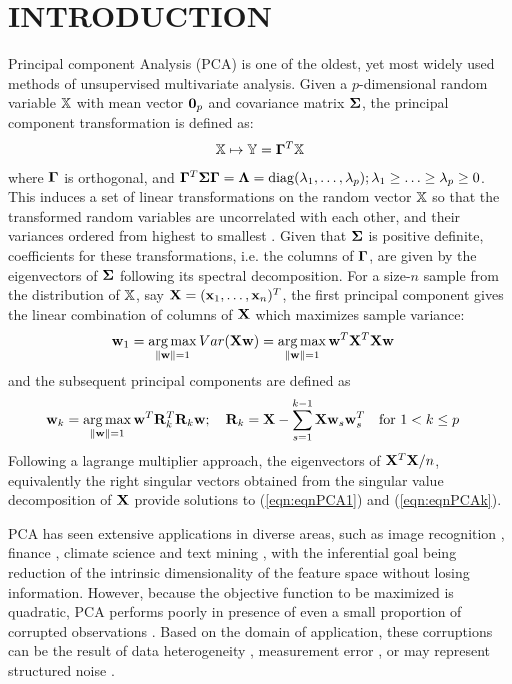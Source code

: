 \section*{\sffamily \Large INTRODUCTION}

Principal component Analysis (PCA) is one of the oldest, yet most widely used methods of unsupervised multivariate analysis. Given a $p$-dimensional random variable ${\mathbb{X}}$ with mean vector ${\bf 0}_p$ and covariance matrix ${\boldsymbol{\Sigma}}$, the principal component transformation is defined as:
%
\begin{align}
{\mathbb{X}} \mapsto {\mathbb{Y}} = {\boldsymbol{\Gamma}}^T {\mathbb{X}}
\end{align}
%
where ${\boldsymbol{\Gamma}}$ is orthogonal, and ${\boldsymbol{\Gamma}}^T {\boldsymbol{\Sigma}} {\boldsymbol{\Gamma}} = {\boldsymbol{\Lambda}} = \operatorname*{diag}( \lambda_1, \ldots, \lambda_p); \lambda_1 \geq \ldots \geq \lambda_p \geq 0$. This induces a set of linear transformations on the random vector ${\mathbb{X}}$ so that the transformed random variables are uncorrelated with each other, and their variances ordered from highest to smallest \citep{MardiaKentBibby}. Given that ${\boldsymbol{\Sigma}}$ is positive definite, coefficients for these transformations, i.e. the columns of ${\boldsymbol{\Gamma}}$, are given by the eigenvectors of ${\boldsymbol{\Sigma}}$ following its spectral decomposition. For a size-$n$ sample from the distribution of ${\mathbb{X}}$, say ${\mathbf{X}} = ({\bf{x}}_1, \ldots, {\bf{x}}_n)^T$, the first principal component gives the linear combination of columns of ${\mathbf{X}}$ which maximizes sample variance:
%
\begin{align}\label{eqn:eqnPCA1}
{\bf{w}}_1 &= \operatorname*{arg\,max}_{\| {\bf{w}} \| = 1} Var ({\mathbf{X}} {\bf{w}} ) = \operatorname*{arg\,max}_{\| {\bf{w}} \| = 1} {\bf{w}}^T {\mathbf{X}}^T {\mathbf{X}} {\bf{w}}
\end{align}
%
and the subsequent principal components are defined as
\begin{align}\label{eqn:eqnPCAk}
{\bf{w}}_k &= \operatorname*{arg\,max}_{\| {\bf{w}} \| = 1} {\bf{w}}^T {\mathbf{R}}_k^T {\mathbf{R}}_k {\bf{w}}; \quad {\mathbf{R}}_k = {\mathbf{X}} - \sum_{s=1}^{k-1} {\mathbf{X}} {\bf{w}}_s {\bf{w}}_s^T \quad \text{for } 1< k \leq p
\end{align}
%
Following a lagrange multiplier approach, the eigenvectors of ${\mathbf{X}}^T {\mathbf{X}}/n$, equivalently the right singular vectors obtained from the singular value decomposition of ${\mathbf{X}}$ provide solutions to (\ref{eqn:eqnPCA1}) and (\ref{eqn:eqnPCAk}).

PCA has seen extensive applications in diverse areas, such as image recognition \citep{AlkandariAljaber15}, finance \citep{AlexanderBook}, climate science \citep{WilksBook} and text mining \citep{BerryCastellanos}, with the inferential goal being reduction of the intrinsic dimensionality of the feature space without losing information. However, because the objective function to be maximized is quadratic, PCA performs poorly in presence of even a small proportion of corrupted observations \citep{XuCaramanisMannor13}. Based on the domain of application, these corruptions can be the result of data heterogeneity \citep{SahaEtal16}, measurement error \citep{Bailey12,HelltonThoresen14}, or may represent structured noise \citep{CandesEtal09}.

